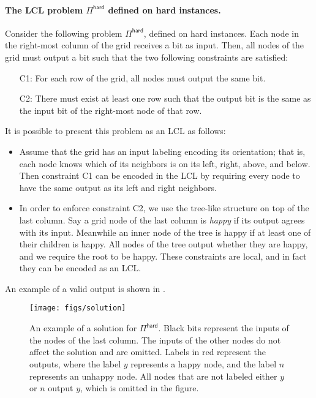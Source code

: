 \documentclass[11pt]{article}
\newcommand{\lhard}{\mathsf {hard}}
\begin{document}
\paragraph{\boldmath The LCL problem $\Pi^{\lhard}$ defined on hard instances.}
Consider the following problem $\Pi^{\lhard}$, defined on hard instances. Each
node in the right-most column of the grid receives a bit as input. Then, all
nodes of the grid must output a bit such that the two following constraints are
satisfied:
\begin{enumerate}
	\item[C1:] For each row of the grid, all nodes must output the same bit.
	\item[C2:] There must exist at least one row such that the output bit is the
	same as the input bit of the right-most node of that row.
\end{enumerate} 
It is possible to present this problem as an LCL as follows:
\begin{itemize}
	\item Assume that the grid has an input labeling encoding its orientation;
	that is, each node knows which of its neighbors is on its left, right,
	above, and below. Then constraint C1 can be encoded in the LCL by requiring
	every node to have the same output as its left and right neighbors.
	\item In order to enforce constraint C2, we use the tree-like structure on top
	of the last column. Say a grid node of the last column is \emph{happy} if its
	output agrees with its input. Meanwhile an inner node of the tree is happy if
	at least one of their children is happy. All nodes of the tree output whether
	they are happy, and we require the root to be happy. These constraints are
	local, and in fact they can be encoded as an LCL.
\end{itemize}
An example of a valid output is shown in .

\begin{figure}[t]
	\centering
	\texttt{[image: figs/solution]}
	\caption{An example of a solution for $\Pi^{\lhard}$. Black bits represent the inputs of the nodes of the last column. The inputs of the other nodes do not affect the solution and are omitted. Labels in red represent the outputs, where the label $y$ represents a happy node, and the label $n$ represents an unhappy node. All nodes that are not labeled either $y$ or $n$ output $y$, which is omitted in the figure.}\label{fig:solution}
\end{figure}
\end{document}
